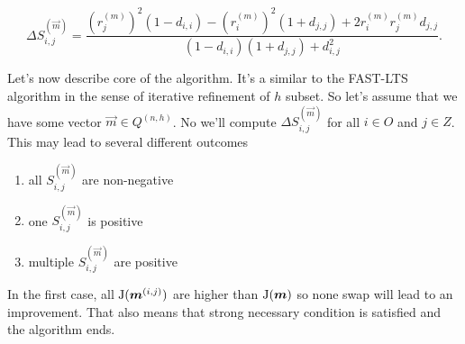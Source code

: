\begin{equation} \label{hawkins:rovnice}
	\Delta S^{(\vec{m})}_{i,j} = 
	\frac{({r}^{(m)}_{j})^2(1-d_{i,i})- ({r}^{(m)}_{i})^2(1+d_{j,j}) + 2{r}^{(m)}_{i}{r}^{(m)}_{j}d_{j,j}}
	{(1-d_{i,i})(1+d_{j,j}) + d_{i,j}^2}.
\end{equation}

Let's now describe core of the algorithm. It's a  similar to the FAST-LTS algorithm in the sense of iterative refinement of $h$ subset. So let's assume that we have some vector  $\vec{m} \in Q^{(n,h)}$. No we'll compute  $\Delta S^{(\vec{m})}_{i,j}$ for all $i \in O$ and $j \in Z$. This may lead to several different outcomes

\begin{enumerate}
	\item all $S^{(\vec{m})}_{i,j}$ are non-negative
	\item one $S^{(\vec{m})}_{i,j}$ is positive
	\item multiple $S^{(\vec{m})}_{i,j}$ are positive
\end{enumerate}

In the first case, all $\operatorname{J}(\boldsymbol{m}^{(i,j)})$ are higher than $\operatorname{J}(\boldsymbol{m})$ so none swap will lead to an improvement. That also means that strong necessary condition is satisfied and the algorithm ends.

